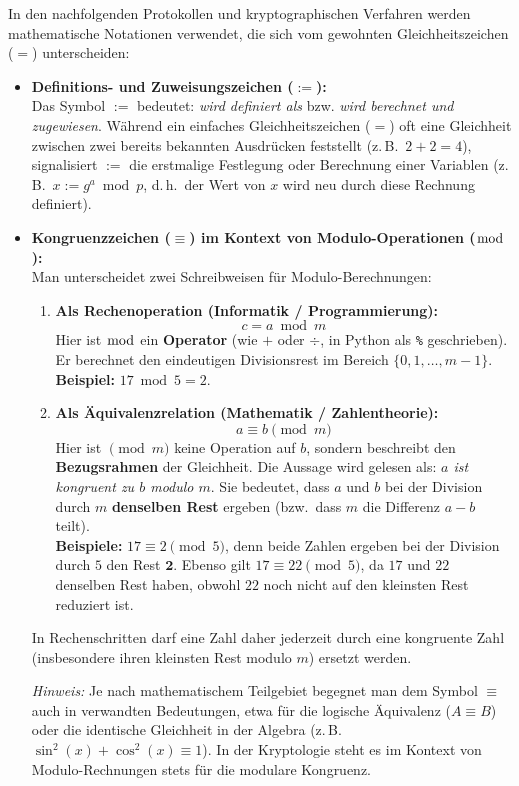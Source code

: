 \begin{myremark}\label{rem:operatoren}
	In den nachfolgenden Protokollen und kryptographischen Verfahren werden mathematische Notationen verwendet, die sich vom gewohnten Gleichheitszeichen ($=$) unterscheiden:
	\begin{itemize}
		\item \textbf{Definitions- und Zuweisungszeichen ($:=$):}\\
		      Das Symbol $:=$ bedeutet: \emph{wird definiert als} bzw. \emph{wird berechnet und zugewiesen}. Während ein einfaches Gleichheitszeichen ($=$) oft eine Gleichheit zwischen zwei bereits bekannten Ausdrücken feststellt (z.\,B.\ $2 + 2 = 4$), signalisiert $:=$ die erstmalige Festlegung oder Berechnung einer Variablen (z.\,B.\ $x := g^a \bmod p$, d.\,h.\ der Wert von $x$ wird neu durch diese Rechnung definiert).
		\item \textbf{Kongruenzzeichen ($\equiv$) im Kontext von Modulo-Operationen ($\bmod$):}\\
		      Man unterscheidet zwei Schreibweisen für Modulo-Berechnungen:
		      \begin{enumerate}
			      \item \textbf{Als Rechenoperation (Informatik / Programmierung):}
			            \[
				            c = a \bmod m
			            \]
			            Hier ist $\bmod$ ein \textbf{Operator} (wie $+$ oder $\div$, in Python als \texttt{\%} geschrieben). Er berechnet den eindeutigen Divisionsrest im Bereich $\{0, 1, \dots, m-1\}$.\\
			            \textbf{Beispiel:} $17 \bmod 5 = 2$.
			      \item \textbf{Als Äquivalenzrelation (Mathematik / Zahlentheorie):}
			            \[
				            a \equiv b \pmod m
			            \]
			            Hier ist $\pmod m$ keine Operation auf $b$, sondern beschreibt den \textbf{Bezugsrahmen} der Gleichheit. Die Aussage wird gelesen als: \emph{$a$ ist kongruent zu $b$ modulo $m$}. Sie bedeutet, dass $a$ und $b$ bei der Division durch $m$ \textbf{denselben Rest} ergeben (bzw.\ dass $m$ die Differenz $a - b$ teilt).\\
			            \textbf{Beispiele:} $17 \equiv 2 \pmod 5$, denn beide Zahlen ergeben bei der Division durch $5$ den Rest $\mathbf{2}$. Ebenso gilt $17 \equiv 22 \pmod 5$, da $17$ und $22$ denselben Rest haben, obwohl $22$ noch nicht auf den kleinsten Rest reduziert ist.
		      \end{enumerate}
		      In Rechenschritten darf eine Zahl daher jederzeit durch eine kongruente Zahl (insbesondere ihren kleinsten Rest modulo $m$) ersetzt werden.

		      \emph{Hinweis:} Je nach mathematischem Teilgebiet begegnet man dem Symbol $\equiv$ auch in verwandten Bedeutungen, etwa für die logische Äquivalenz ($A \equiv B$) oder die identische Gleichheit in der Algebra (z.\,B.\ $\sin^2(x) + \cos^2(x) \equiv 1$). In der Kryptologie steht es im Kontext von Modulo-Rechnungen stets für die modulare Kongruenz.
	\end{itemize}
\end{myremark}


